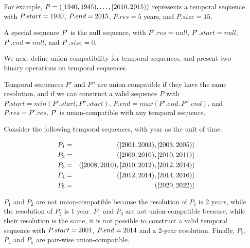 For example, $P=([1940,1945), \ldots,
  [2010,2015))$ represents a temporal sequence with
    $P.start=1940$, $P.end=2015$, $P.res=5$ years, and
    $P.size=15$.

A special sequence $P^{\epsilon}$ is the null sequence, with
$P^{\epsilon}.res=null$, $P^{\epsilon}.start=null$,
$P^{\epsilon}.end=null$, and  $P^{\epsilon}.size=0$.

We next define union-compatibility for temporal sequences, and present
two binary operations on temporal sequences.

\begin{definition} 
Temporal sequences $P'$ and $P''$ are union-compatible if they have
the same resolution, and if we can construct a valid sequence $P$ with
$P.start = min(P'.start, P''.start)$, $P.end = max(P'.end, P''.end)$,
and $P.res = P'.res$.  $P^{\epsilon}$ is union-compatible with any
temporal sequence.
\label{def:tcompat} 
\end{definition}

\begin{example}
\label{ex:ex1}
Consider the following temporal sequences, with year as the unit of
time.

\vspace{-0.3cm}

\begin{eqnarray*}
P_1 & = & ([2001,2003),[2003,2005))\\
P_2 & = & ([2009,2010),[2010,2011)) \\
P_3 & = & ([2008,2010),[2010,2012),[2012,2014))\\
P_4 & = & ([2012,2014),[2014,2016))\\
P_5 & = & ([2020,2022)) \\
\end{eqnarray*}

\vspace{-0.5cm}

$P_1$ and $P_2$ are not union-compatible because the resolution of
  $P_1$ is 2 years, while the resolution of $P_2$ is 1 year.  $P_1$
  and $P_3$ are not union-compatible because, while their resolution
  is the same, it is not possible to construct a valid temporal
  sequence with $P.start=2001$, $P.end=2014$ and a 2-year
  resolution.  Finally, $P_3$, $P_4$ and $P_5$ are pair-wise
  union-compatible.
\end{example}

